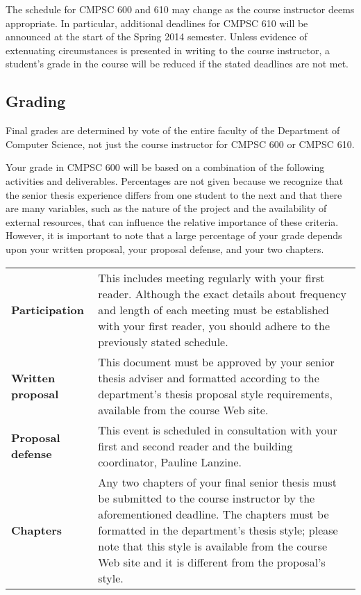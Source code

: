 \noindent
The schedule for CMPSC 600 and 610 may change as the course instructor deems appropriate. In particular, additional
deadlines for CMPSC 610 will be announced at the start of the Spring 2014 semester. Unless evidence of extenuating
circumstances is presented in writing to the course instructor, a student's grade in the course will be reduced if the
stated deadlines are not met.

\subsection*{Grading}

Final grades are determined by vote of the entire faculty of the Department of Computer Science, not just the course instructor
for CMPSC 600 or CMPSC 610.

Your grade in CMPSC 600 will be based on a combination of the following activities and deliverables. Percentages are not
given because we recognize that the senior thesis experience differs from one student to the next and that there are many
variables, such as the nature of the project and the availability of external resources, that can influence the relative
importance of these criteria. However, it is important to note that a large percentage of your grade depends upon your
written proposal, your proposal defense, and your two chapters.  

% 

\begin{center}
\begin{tabular}{lp{4in}}

\bf Participation & This includes meeting regularly with your first reader. Although the exact details about frequency and
length of each meeting must be established with your first reader, you should adhere to the previously stated schedule.
\\[.1in]

\bf Written proposal & This document must be approved by your senior thesis adviser and formatted according to the 
department's thesis proposal style requirements, available from the course Web site. \\[.1in]

\bf Proposal defense & This event is scheduled in consultation with your first and second reader and the building
coordinator, Pauline Lanzine. \\[.1in]

\bf Chapters & Any two chapters of your final senior thesis must be submitted to the course instructor by the
aforementioned deadline.  The chapters must be formatted in the department's thesis style; please note that
this style is available from the course Web site and it is different from the proposal's style.

\end{tabular}
\end{center}

